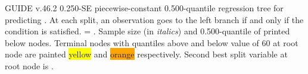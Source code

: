 \documentclass[12pt]{article}
\begin{document}
 \begin{center}
 \end{center}
GUIDE v.46.2 0.250-SE
 piecewise-constant  0.500-quantile regression tree
for predicting \texttt{}.
At each split, an observation goes to the left branch 
 if and only if the condition is satisfied.
\texttt{} = \texttt{}.
 Sample size (in \emph{italics}) and 0.500-quantile of \texttt{} printed below nodes.
 Terminal nodes with quantiles above and below value of 60 at root node are painted \colorbox{yellow}{yellow} and \colorbox{orange}{orange} respectively.
 Second best split variable at root node is \texttt{}.
 
\end{document}
